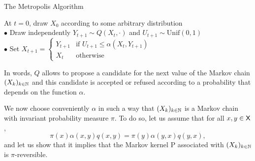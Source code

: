\documentclass[english,graybox,envcountchap,envcountsame,sectrefs,shortlabels]{svmono}
\theoremstyle{style}
\begin{document}
\begin{algorithm}
\caption{\label{alg:mh}The Metropolis Algorithm}

{}
\BlankLine
At $t=0$, draw $X_{0}$ according to some arbitrary distribution\\
{
$\bullet$ Draw independently $Y_{t+1}\sim Q(X_{t},\cdot)$ and $U_{t+1}\sim\mathrm{Unif}(0,1)$\\
$\bullet$ Set $X_{t+1}=\begin{cases} Y_{t+1} & \mbox{if }U_{t+1}\leq\alpha(X_{t},Y_{t+1})\\ X_{t} & \mbox{otherwise} \end{cases}$
}
\end{algorithm}
 In words, $Q$ allows to propose a candidate for the next value of
the Markov chain $(X_{k})_{k\in\mathbb{N}}$ and this candidate is accepted or
refused according to a probability that depends on the function $\alpha$.

We now choose conveniently $\alpha$ in such a way that $(X_{k})_{k\in\mathbb{N}}$
is a Markov chain with invariant probability measure $\pi$. To do so, let us assume that
for all $x,y\in\mathsf{X}$,
\begin{equation}
\pi(x)\alpha(x,y)q(x,y)=\pi(y)\alpha(y,x)q(y,x),\label{eq:balance}
\end{equation}
and let us show that it implies that the Markov kernel P associated
with $(X_{k})_{k\in\mathbb{N}}$ is $\pi$-reversible.
\end{document}
